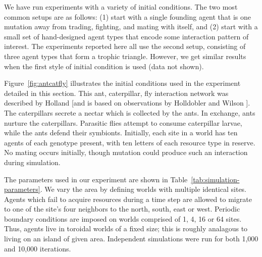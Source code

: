 We have run experiments with a variety of initial conditions.  The two
most common setups are as follows: (1) start with a single founding
agent that is one mutation away from trading, fighting, and mating with 
itself, and (2) start with a small set of hand-designed agent types
that encode some interaction pattern of interest.  The experiments
reported here all use the second setup, consisting of three agent
types that form a trophic triangle.  However, we get similar results
when the first style of initial condition is used (data not shown).

Figure~\ref{fig:antcatfly} illustrates the initial conditions
used in the experiment detailed in this section.  This ant,
caterpillar, fly interaction network was described by Holland
\cite{Holland9?} [and is based on observations by Holldobler and
Wilson \cite{HolldoblerAndWilson90}].  The caterpillars secrete a
nectar which is collected by the ants.  In exchange, ants nurture
the caterpillars.  Parasitic flies attempt to consume caterpillar
larvae, while the ants defend their symbionts.  Initially, each site
in a world has ten agents of each genotype present, with ten letters
of each resource type in reserve.  No mating occurs initially, though
mutation could produce such an interaction during simulation.

The parameters used in our experiment are shown in
Table~\ref{tab:simulation-parameters}.  We vary the area
by defining worlds with multiple identical sites.  Agents
which fail to acquire resources during a time step are allowed to
migrate to one of the site's four neighbors to the north, south, east
or west.  Periodic boundary conditions are imposed on worlds
comprised of 1, 4, 16 or 64 sites.  Thus, agents live in toroidal
worlds of a fixed size; this is roughly analagous to living on an 
island of given area.  Independent simulations were run for both 1,000
and 10,000 iterations.

